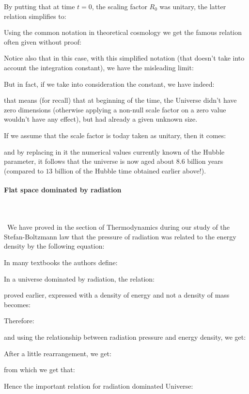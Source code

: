 	By putting that at time $t=0$, the scaling factor $R_0$ was unitary, the latter relation simplifies to:
	
	Using the common notation in theoretical cosmology we get the famous relation often given without proof:
	
	Notice also that in this case, with this simplified notation (that doesn't take into account the integration constant), we have the misleading limit:
	
	But in fact, if we take into consideration the constant, we have indeed:
	
	that means (for recall) that at beginning of the time, the Universe didn't have zero dimensions (otherwise applying a non-null scale factor on a zero value wouldn't have any effect), but had already a given unknown size.
	
	If we assume that the scale factor is today taken as unitary, then it comes:
	
	and by replacing in it the numerical values currently known of the Hubble parameter, it follows that the universe is now aged about $8.6$ billion years (compared to $13$ billion of the Hubble time obtained earlier above!).
	
	\paragraph{Flat space dominated by radiation}\mbox{}\\\\\
	We have proved in the section of Thermodynamics during our study of the Stefan-Boltzmann law that the pressure of radiation was related to the energy density by the following equation:
	 
	\begin{tcolorbox}[title=Remark,colframe=black,arc=10pt]
	In many textbooks the authors define:
	
	\end{tcolorbox}
	In a universe dominated by radiation, the relation:
	
	 proved earlier, expressed with a density of energy and not a density of mass becomes:
	
	Therefore:
	
	and using the relationship between radiation pressure and energy density, we get:
	
	After a little rearrangement, we get:
	
	from which we get that:
	
	Hence the important relation for radiation dominated Universe:
	
